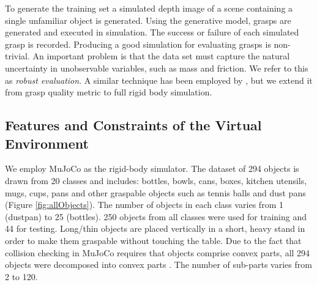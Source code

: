 
To generate the training set a simulated depth image of a scene containing a single unfamiliar object is generated. Using the generative model, grasps are generated and executed in simulation. The success or failure of each simulated grasp is recorded. Producing a good simulation for evaluating grasps is non-trivial. An important problem is that the data set must capture the natural uncertainty in unobservable variables, such as mass and friction. We refer to this as {\em robust evaluation}. A similar technique has been employed by \cite{mahler2017dex}, but we extend it from grasp quality metric to full rigid body simulation.

\subsection{Features and Constraints of the Virtual Environment}
\label{subsection:environment}

We employ MuJoCo \cite{MuJoCo} as the rigid-body simulator. The dataset of 294 objects is drawn from 20 classes and includes: bottles, bowls, cans, boxes, kitchen utensils, mugs, cups, pans and other graspable objects such as tennis balls and dust pans (Figure \ref{fig:allObjects}). The number of objects in each class varies from 1 (dustpan) to 25 (bottles). 250 objects from all classes were used for training and 44 for testing. Long/thin objects are placed vertically in a short, heavy stand in order to make them graspable without touching the table. Due to the fact that collision checking in MuJoCo requires that objects comprise convex parts, all 294 objects were decomposed into convex parts \cite{V-HACD}. The number of sub-parts varies from 2 to 120. 

